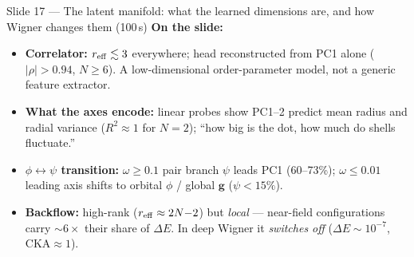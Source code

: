 \documentclass[11pt]{article}
\begin{document}
\begin{slide}{Slide 17 --- The latent manifold: what the learned dimensions are, and how Wigner changes them (100\,s)}
\textbf{On the slide:}
\begin{itemize}[leftmargin=*]
\item \textbf{Correlator:} $r_{\rm eff}\lesssim 3$ everywhere; head reconstructed from PC1 alone
($|\rho|>0.94$, $N\ge6$). A low-dimensional order-parameter model, not a generic feature extractor.
\item \textbf{What the axes encode:} linear probes show PC1--2 predict mean radius and radial variance
($R^2\approx1$ for $N{=}2$); ``how big is the dot, how much do shells fluctuate.''
\item \textbf{$\phi\leftrightarrow\psi$ transition:} $\omega\ge0.1$ pair branch $\psi$ leads PC1
(60--73\%); $\omega\le0.01$ leading axis shifts to orbital $\phi$ / global $\mathbf g$ ($\psi<15\%$).
\item \textbf{Backflow:} high-rank ($r_{\rm eff}\approx 2N{-}2$) but \emph{local} --- near-field
configurations carry $\sim6\times$ their share of $\Delta E$. In deep Wigner it \emph{switches off}
($\Delta E\sim10^{-7}$, CKA$\approx1$).
\end{itemize}
\end{slide}
\end{document}
